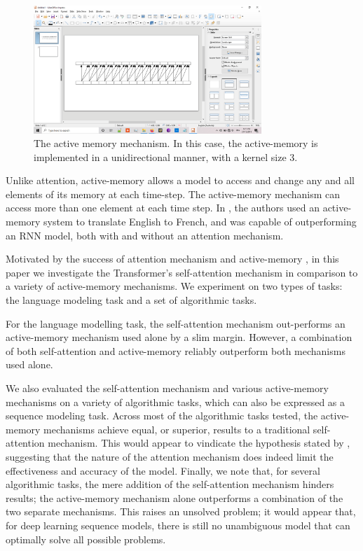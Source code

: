 \documentclass{article}
\begin{document}
\begin{figure}[!h]
\includegraphics[clip,trim={6.5cm 7.7cm 11cm 8.7cm},width=8.6cm]{active-memory.png}
\vspace{-6pt}
\caption{The active memory mechanism. In this case, the active-memory is implemented in a unidirectional manner, with a kernel size 3.}
\label{fig:arch}
\vspace{-6pt}
\end{figure}

Unlike attention, active-memory allows a model to access and change any and all elements of its memory at each time-step. 
The active-memory mechanism can access more than one element at each time step. 
In \cite{kaiser2016}, the authors used an active-memory system to translate English to French, and was capable of outperforming an RNN model, both with and without an attention mechanism.

Motivated by the success of attention mechanism \cite{vaswani2017} and active-memory \cite{kaiser2016}, in this paper we investigate the Transformer's self-attention mechanism in comparison to a variety of active-memory mechanisms. We experiment on two types of tasks: the language modeling task and a set of algorithmic tasks.

For the language modelling task, the self-attention mechanism out-performs an active-memory mechanism used alone by a slim margin. However, a combination of both self-attention and active-memory reliably outperform both mechanisms used alone.

We also evaluated the self-attention mechanism and various active-memory mechanisms on a variety of algorithmic tasks, which can also be expressed as a sequence modeling task. Across most of the algorithmic tasks tested, the active-memory mechanisms achieve equal, or superior, results to a traditional self-attention mechanism. This would appear to vindicate the hypothesis stated by \cite{kaiser2016}, suggesting that the nature of the attention mechanism does indeed limit the effectiveness and accuracy of the model.
Finally, we note that, for several algorithmic tasks, the mere addition of the self-attention mechanism hinders results; the active-memory mechanism alone outperforms a combination of the two separate mechanisms. This raises an unsolved problem; it would appear that, for deep learning sequence models, there is still no unambiguous model that can optimally solve all possible problems.
\end{document}
